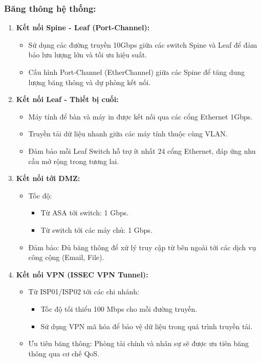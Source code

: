 \documentclass[13pt]{article}
\begin{document}
\subsubsection{Băng thông hệ thống:}
\begin{enumerate}
    \item \textbf{Kết nối Spine - Leaf (Port-Channel):}
    \begin{itemize}
        \item Sử dụng các đường truyền 10Gbps giữa các switch Spine và Leaf để đảm bảo lưu lượng lớn và tối ưu hiệu suất.
        \item Cấu hình Port-Channel (EtherChannel) giữa các Spine để tăng dung lượng băng thông và dự phòng kết nối.
    \end{itemize}
    \item \textbf{Kết nối Leaf - Thiết bị cuối:}
    \begin{itemize}
        \item Máy tính để bàn và máy in được kết nối qua các cổng Ethernet 1Gbps.
        \item Truyền tải dữ liệu nhanh giữa các máy tính thuộc cùng VLAN.
        \item Đảm bảo mỗi Leaf Switch hỗ trợ ít nhất 24 cổng Ethernet, đáp ứng nhu cầu mở rộng trong tương lai.
    \end{itemize}
    \item \textbf{Kết nối tới DMZ:}
    \begin{itemize}
        \item Tốc độ:
        \begin{itemize}
            \item Từ ASA tới switch: 1 Gbps.
            \item Từ switch tới các máy chủ: 1 Gbps.
        \end{itemize}
        \item Đảm bảo: Đủ băng thông để xử lý truy cập từ bên ngoài tới các dịch vụ công cộng (Email, File).
    \end{itemize}

    \item \textbf{Kết nối VPN (ISSEC VPN Tunnel):}
    \begin{itemize}
        \item Từ ISP01/ISP02 tới các chi nhánh:
        \begin{itemize}
            \item Tốc độ tối thiểu 100 Mbps cho mỗi đường truyền.
            \item Sử dụng VPN mã hóa để bảo vệ dữ liệu trong quá trình truyền tải.
        \end{itemize}
        \item Ưu tiên băng thông: Phòng tài chính và nhân sự sẽ được ưu tiên băng thông qua cơ chế QoS.
    \end{itemize}


\end{enumerate}
\end{document}
